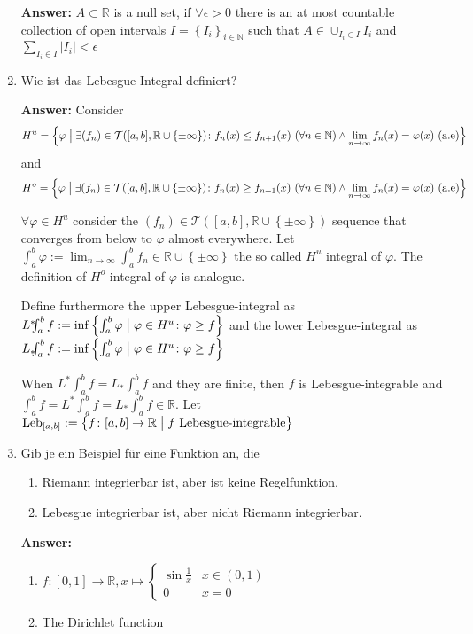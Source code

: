 \documentclass[11pt]{article}
\newcommand{\abs}[1]{\left|#1\right|}
\newcommand{\RR}[0]{\mathbb{R}}
\newcommand{\NN}[0]{\mathbb{N}}
\DeclareMathOperator{\Leb}{Leb}
\begin{document}
\begin{enumerate}
    \textbf{Answer:} $A \subset \RR$ is a null set, if $\forall \epsilon > 0$ there is an at most countable collection of open intervals $I = \left\{I_i\right\}_{i \in \NN}$ such that $A \in \cup_{I_i \in I} I_i$ and $\sum_{I_i \in I} \abs{I_i} < \epsilon$

    \item Wie ist das Lebesgue-Integral definiert?

    \textbf{Answer:} Consider $$H^u = \left\{\varphi \bigm| \exists (f_n) \in \mathcal{T}([a, b], \RR \cup \left\{\pm\infty\right\})\colon f_n(x) \le f_{n+1}(x)~(\forall n \in \NN) \land \lim_{n\to\infty}f_n(x) = \varphi(x)~(\text{a.e}) \right\} $$ and $$H^o = \left\{\varphi \bigm| \exists (f_n) \in \mathcal{T}([a, b], \RR \cup \left\{\pm\infty\right\})\colon f_n(x) \ge f_{n+1}(x)~(\forall n \in \NN) \land \lim_{n\to\infty}f_n(x) = \varphi(x)~(\text{a.e}) \right\} $$

    $\forall \varphi \in H^u$ consider the $(f_n) \in \mathcal{T}([a, b], \RR \cup \left\{\pm\infty\right\})$ sequence that converges from below to $\varphi$ almost everywhere. Let $\int_a^b \varphi := \lim_{n\to\infty}\int_a^b f_n \in \RR \cup \left\{\pm\infty\right\}$ the so called $H^u$ integral of $\varphi$. The definition of $H^o$ integral of $\varphi$ is analogue.

    Define furthermore the upper Lebesgue-integral as $L^*\!\!\!\int_a^b f := \inf\left\{\int_a^b \varphi \bigm| \varphi \in H^u\colon \varphi \ge f\right\}$ and the lower Lebesgue-integral as $L_*\!\!\!\int_a^b f := \inf\left\{\int_a^b \varphi \bigm| \varphi \in H^u\colon \varphi \ge f\right\}$

    When $L^*\!\!\!\int_a^b f = L_*\!\!\!\int_a^b f$ and they are finite, then $f$ is Lebesgue-integrable and $\int_a^b f = L^*\!\!\!\int_a^b f = L_*\!\!\!\int_a^b f \in \RR$. Let $\Leb_{[a, b]} := \left\{f\colon[a, b]\to \RR \bigm| f\text{ Lebesgue-integrable}\right\}$

    \item Gib je ein Beispiel für eine Funktion an, die
    \begin{enumerate}
        \item Riemann integrierbar ist, aber ist keine Regelfunktion.
        \item Lebesgue integrierbar ist, aber nicht Riemann integrierbar.
    \end{enumerate}

    \textbf{Answer:}
    \begin{enumerate}
        \item $f\colon [0, 1] \to \RR, x \mapsto \begin{cases}
            \sin{\frac{1}{x}}&x \in (0, 1)\\
            0&x=0
        \end{cases}$
        \item The Dirichlet function
    \end{enumerate}


\end{enumerate}
\end{document}
